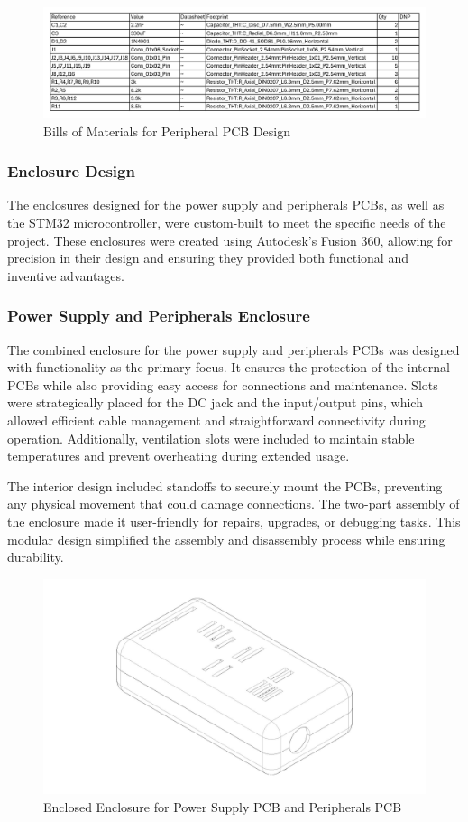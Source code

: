 \documentclass[12pt]{article}
\begin{document}
\begin{figure}[H]
  \includegraphics[width=\textwidth]{../assets/pcb/image9.jpg}
  \caption{Bills of Materials for Peripheral PCB Design}
\end{figure}
\subsubsection{Enclosure Design} 
The enclosures designed for the power supply
and peripherals PCBs, as well as the STM32 microcontroller, were custom-built
to meet the specific needs of the project. These enclosures were created using
Autodesk’s Fusion 360, allowing for precision in their design and ensuring they
provided both functional and inventive advantages.

\subsubsection*{Power Supply and Peripherals Enclosure} 
The combined enclosure
for the power supply and peripherals PCBs was designed with functionality as
the primary focus. It ensures the protection of the internal PCBs while also
providing easy access for connections and maintenance. Slots were strategically
placed for the DC jack and the input/output pins, which allowed efficient cable
management and straightforward connectivity during operation. Additionally,
ventilation slots were included to maintain stable temperatures and prevent
overheating during extended usage.

The interior design included standoffs to securely mount the PCBs, preventing
any physical movement that could damage connections. The two-part assembly of
the enclosure made it user-friendly for repairs, upgrades, or debugging tasks.
This modular design simplified the assembly and disassembly process while
ensuring durability.

\begin{figure}[H]
  \includegraphics[width=\textwidth]{../assets/pcb/image10.jpg}
  \caption{Enclosed Enclosure for Power Supply PCB and Peripherals PCB}
\end{figure}
\end{document}
